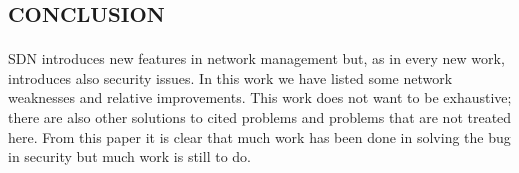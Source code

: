 %
\section*{\small\textsc{conclusion}}
\ac{SDN} introduces new features in network management but, as in every new work, introduces also security issues. In this work we have listed some network weaknesses and relative improvements. This work does not want to be exhaustive; there are also other solutions to cited problems and problems that are not treated here. From this paper it is clear that much work has been done in solving the bug in security but much work is still to do.